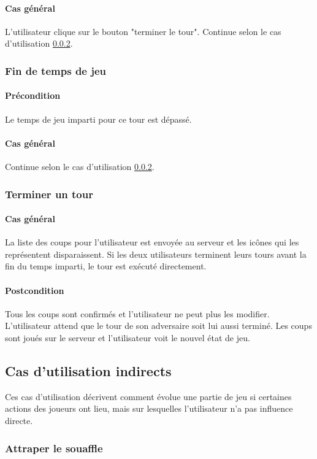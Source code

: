     \paragraph{Cas général} L'utilisateur clique sur le bouton "terminer le tour". Continue selon le cas d'utilisation \ref{UC:endTurn}.

\subsubsection{Fin de temps de jeu}
    \paragraph{Précondition} Le temps de jeu imparti pour ce tour est dépassé.
    \paragraph{Cas général} Continue selon le cas d'utilisation \ref{UC:endTurn}.

\subsubsection{Terminer un tour}
    \label{UC:endTurn}
    \paragraph{Cas général} La liste des coups pour l'utilisateur est envoyée au serveur et les icônes qui les représentent disparaissent. Si les deux utilisateurs terminent leurs tours avant la fin du temps imparti, le tour est exécuté directement.
    \paragraph{Postcondition} Tous les coups sont confirmés et l'utilisateur ne peut plus les modifier. L'utilisateur attend que le tour de son adversaire soit lui aussi terminé. Les coups sont joués sur le serveur et l'utilisateur voit le nouvel état de jeu.

\subsection{Cas d'utilisation indirects}
Ces cas d'utilisation décrivent comment évolue une partie de jeu si certaines actions des joueurs ont lieu, mais sur lesquelles l'utilisateur n'a pas influence directe.

\subsubsection{Attraper le souaffle}
